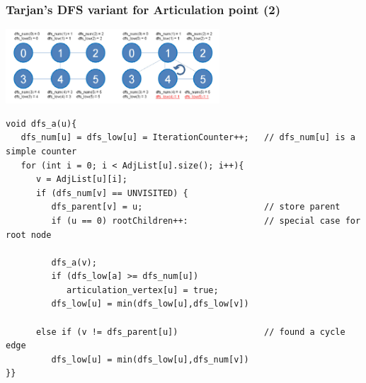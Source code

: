 \documentclass{beamer}
\begin{document}
\begin{frame}[fragile]
  \frametitle{Tarjan's DFS variant for Articulation point (2)}
  \begin{center}
    \includegraphics[width=0.6\textwidth]{../img/graph_articulation}
  \end{center}
  
{\tiny
  \begin{exampleblock}{}
\begin{verbatim}
void dfs_a(u){
   dfs_num[u] = dfs_low[u] = IterationCounter++;   // dfs_num[u] is a simple counter
   for (int i = 0; i < AdjList[u].size(); i++){
      v = AdjList[u][i];
      if (dfs_num[v] == UNVISITED) {
         dfs_parent[v] = u;                        // store parent
         if (u == 0) rootChildren++:               // special case for root node

         dfs_a(v);
         if (dfs_low[a] >= dfs_num[u])
            articulation_vertex[u] = true;
         dfs_low[u] = min(dfs_low[u],dfs_low[v])

      else if (v != dfs_parent[u])                 // found a cycle edge
         dfs_low[u] = min(dfs_low[u],dfs_num[v])
}}
\end{verbatim}
  \end{exampleblock}}
\end{frame}
\end{document}
